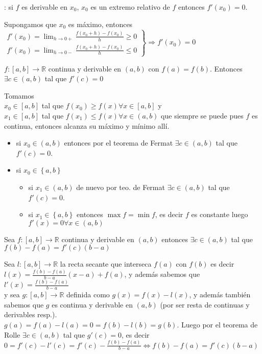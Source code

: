 \documentclass[a4paper,10pt]{article}
\begin{document}
: si $f$ es derivable en $x_0$, $x_0$ es un extremo relativo de $f$ entonces $f'(x_0)=0$. \\
\begin{demo}
Supongamos que $x_0$ es máximo, entonces
$\displaystyle
\left.
\begin{array}{c}
\displaystyle f'(x_0) = \lim_{h \rightarrow 0+} \frac{f(x_0+h)-f(x_0)}{h} \geq 0 \\
\displaystyle f'(x_0) = \lim_{h \rightarrow 0-} \frac{f(x_0+h)-f(x_0)}{h} \leq 0
\end{array}
\right\rbrace \Rightarrow f'(x_0) = 0$
\end{demo}
 $f:[a,b] \rightarrow \mathbb{R}$ continua y derivable en $(a,b)$ con $f(a) = f(b)$. Entonces $\exists c \in (a,b)$ tal que $f'(c)=0$
\begin{demo}
Tomamos \\
$x_0 \in [a,b]$ tal que $f(x_0) \geq f(x) \forall x \in [a,b]$ y \\
$x_1 \in [a,b]$ tal que $f(x_1) \leq f(x) \forall x \in (a,b)$ que siempre se puede pues $f$ es continua, entonces alcanza su máximo y mínimo allí. \\
\begin{itemize}
	\item si $x_0 \in (a,b)$ entonces por el teorema de Fermat $\exists c \in (a,b)$ tal que $f'(c)=0$.\\
	\item si $x_0 \in \left\{a,b\right\}$ \\
	\begin{itemize} 
		\item si $x_1 \in (a,b)$ de nuevo por teo. de Fermat $\exists c \in (a,b)$ tal que $f'(c)=0$. \\
		\item si $x_1 \in \left\{a,b\right\}$ entonces $\max{f}=\min{f}$, es decir $f$ es constante luego $f'(x)=0 \forall x \in (a,b)$
	\end{itemize}
\end{itemize}
\end{demo}
 Sea $f:[a,b] \rightarrow \mathbb{R}$ continua y derivable en $(a,b)$ entonces $\exists c \in (a,b)$ tal que $f(b)-f(a) = f'(c)(b-a)$
\begin{demo}
Sea $l:[a,b] \rightarrow \mathbb{R}$ la recta secante que interseca $f(a)$ con $f(b)$ es decir $l(x)=\frac{f(b)-f(a)}{b-a}(x-a)+f(a)$, y además sabemos que $l'(x)=\frac{f(b)-f(a)}{b-a}$ \\
y sea $g:[a,b] \rightarrow \mathbb{R}$ definida como $g(x)=f(x)-l(x)$, y además también sabemos que $g$ es continua y derivable en $(a,b)$ (por ser resta de continuas y derivables resp.). \\
$g(a)=f(a)-l(a)=0=f(b)-l(b)=g(b)$. Luego por el teorema de Rolle $\exists c \in (a,b)$ tal que $g'(c)=0$, es decir $0 = f'(c)-l'(c) = f'(c) - \frac{f(b)-f(a)}{b-a} \Leftrightarrow f(b) - f(a) = f'(c) (b-a)$
\end{demo}
\end{document}

